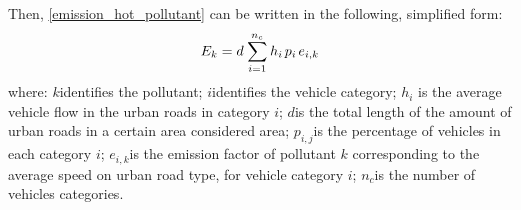 \documentclass[journal]{IEEEtran}
\newcommand{\be}{\begin{equation}}
\newcommand{\ee}{\end{equation}}
\begin{document}
Then, \eqref{emission_hot_pollutant} can be written in the following, simplified form:
\be
E_k = d\hspace{0.3mm} \sum\limits_{i=1}^{n_c}\hspace{0.1mm} h_i\hspace{0.5mm}  p_{i}\hspace{0.5mm} e_{i,k}
\ee
where:
 $k$\hspace{0.8mm}identifies the pollutant;
 $i$\hspace{0.8mm}identifies the vehicle category;
 $h_i$ \hspace{0.8mm}is the average vehicle flow in the urban roads in category $i$;
 $d$\hspace{0.8mm}is the total length of the amount of urban roads in a certain area considered area;
 $p_{i,j}$\hspace{0.8mm}is the percentage of vehicles in each category $i$;
$e_{i,k}$\hspace{0.8mm}is the emission factor of pollutant $k$ corresponding to the average speed on urban road type, for vehicle category $i$;
 $n_c$\hspace{0.8mm}is the number of vehicles categories.
\end{document}
